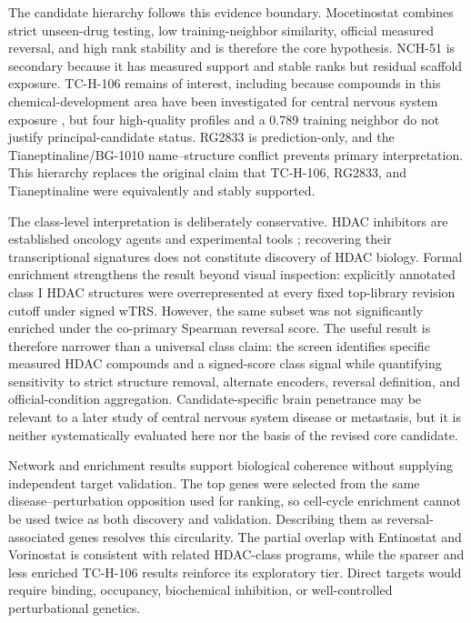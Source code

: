 The candidate hierarchy follows this evidence boundary. Mocetinostat combines strict unseen-drug testing, low training-neighbor similarity, official measured reversal, and high rank stability and is therefore the core hypothesis. NCH-51 is secondary because it has measured support and stable ranks but residual scaffold exposure. TC-H-106 remains of interest, including because compounds in this chemical-development area have been investigated for central nervous system exposure \cite{mcclure2018}, but four high-quality profiles and a 0.789 training neighbor do not justify principal-candidate status. RG2833 is prediction-only, and the Tianeptinaline/BG-1010 name--structure conflict prevents primary interpretation. This hierarchy replaces the original claim that TC-H-106, RG2833, and Tianeptinaline were equivalently and stably supported.

The class-level interpretation is deliberately conservative. HDAC inhibitors are established oncology agents and experimental tools \cite{johnstone2002,bolden2006,bradner2010}; recovering their transcriptional signatures does not constitute discovery of HDAC biology. Formal enrichment strengthens the result beyond visual inspection: explicitly annotated class I HDAC structures were overrepresented at every fixed top-library revision cutoff under signed wTRS. However, the same subset was not significantly enriched under the co-primary Spearman reversal score. The useful result is therefore narrower than a universal class claim: the screen identifies specific measured HDAC compounds and a signed-score class signal while quantifying sensitivity to strict structure removal, alternate encoders, reversal definition, and official-condition aggregation. Candidate-specific brain penetrance may be relevant to a later study of central nervous system disease or metastasis, but it is neither systematically evaluated here nor the basis of the revised core candidate.

Network and enrichment results support biological coherence without supplying independent target validation. The top genes were selected from the same disease--perturbation opposition used for ranking, so cell-cycle enrichment cannot be used twice as both discovery and validation. Describing them as reversal-associated genes resolves this circularity. The partial overlap with Entinostat and Vorinostat is consistent with related HDAC-class programs, while the sparser and less enriched TC-H-106 results reinforce its exploratory tier. Direct targets would require binding, occupancy, biochemical inhibition, or well-controlled perturbational genetics.

